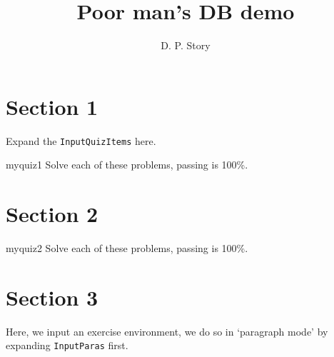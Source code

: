 \documentclass{article}
\title{Poor man's DB demo}
\author{D. P. Story}
\def\cs#1{\texttt{\eqbs#1}}
\begin{document}
\maketitle
\tableofcontents


\section{Section 1}

Expand the \cs{InputQuizItems} here.

\begin{quiz*}{myquiz1}
Solve each of these problems, passing is 100\%.
\begin{questions}




\end{questions}
\end{quiz*}

\section{Section 2}

\InputQuizItems


\begin{quiz*}{myquiz2}
Solve each of these problems, passing is 100\%.
\begin{questions}




\end{questions}
\end{quiz*} %

\section{Section 3}

Here, we input an \textsf{exercise} environment, we do so in `paragraph mode' by expanding
\cs{InputParas} first.

\InputParas

\end{document}
